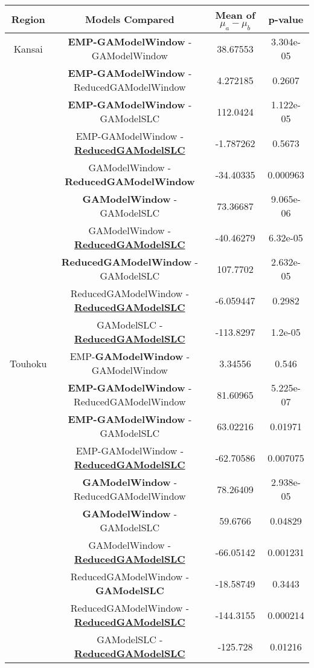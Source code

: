 \begin{table*}[]
	\begin{center}
		\begin{tabular}{|c|c|c|c|}
			\hline
			\multicolumn{1}{|c|}{Region} &
			\multicolumn{1}{|c|}{Models Compared} & \multicolumn{1}{|c|}{Mean of $\mu_a - \mu_b$}&
			\multicolumn{1}{|c|}{p-value} \\
			\hline
			
			Kansai & \textbf{EMP-GAModelWindow} - GAModelWindow &
			 38.67553 &  3.304e-05 \\
			
		    & \textbf{EMP-GAModelWindow} - ReducedGAModelWindow & 4.272185  & 0.2607\\
			
			& \textbf{EMP-GAModelWindow} - GAModelSLC & 
			112.0424 &  1.122e-05\\

			&EMP-GAModelWindow - \underline{\textbf{ReducedGAModelSLC}} &  
			-1.787262 & 0.5673 \\
			
			& GAModelWindow - \textbf{ReducedGAModelWindow} &
			-34.40335 & 0.000963\\
			
			& \textbf{GAModelWindow} - GAModelSLC &
			 73.36687  &9.065e-06\\
				
			& GAModelWindow - \underline{\textbf{ReducedGAModelSLC}} &
			-40.46279 & 6.32e-05\\
				
			& \textbf{ReducedGAModelWindow} - GAModelSLC &
			107.7702  & 2.632e-05\\

			& ReducedGAModelWindow - \underline{\textbf{ReducedGAModelSLC}} &
			-6.059447 &0.2982\\

			& GAModelSLC - \underline{\textbf{ReducedGAModelSLC}} &
			-113.8297 & 1.2e-05\\

			\hline
			Touhoku & EMP-\textbf{GAModelWindow} - GAModelWindow &
			3.34556 & 0.546\\
			& \textbf{EMP-GAModelWindow} - ReducedGAModelWindow &
			81.60965 & 5.225e-07\\
			&	\textbf{EMP-GAModelWindow} - GAModelSLC &
			63.02216 &0.01971\\
			& EMP-GAModelWindow - \underline{\textbf{ReducedGAModelSLC}} &
			-62.70586 & 0.007075\\
			& \textbf{GAModelWindow} - ReducedGAModelWindow & 
			78.26409 & 2.938e-05\\
			& \textbf{GAModelWindow} - GAModelSLC &
			59.6766 & 0.04829\\
			& GAModelWindow - \underline{\textbf{ReducedGAModelSLC}} &
			-66.05142 &0.001231\\
			& ReducedGAModelWindow - \textbf{GAModelSLC} &
			-18.58749 & 0.3443\\
			& ReducedGAModelWindow - \underline{\textbf{ReducedGAModelSLC}} &
			-144.3155 & 0.000214\\
			& GAModelSLC - \underline{\textbf{ReducedGAModelSLC}} &
			-125.728 &0.01216\\


\end{tabular}
\end{center}
\end{table*}

